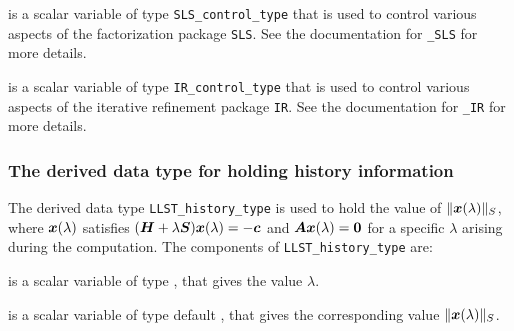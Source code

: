 \documentclass{galahad}
\newcommand{\packagename}{LLST}
\begin{document}
\begin{description}
 is a scalar variable of type
{\tt SLS\_control\_type} that is used to control various aspects of the
factorization package {\tt SLS}. See the documentation for
{\tt \libraryname\_SLS} for more details.

 is a scalar variable of type
{\tt IR\_control\_type} that is used to control various aspects of the
iterative refinement package {\tt IR}. See the documentation for
{\tt \libraryname\_IR} for more details.

\end{description}


\subsubsection{The derived data type for holding history
 information}\label{typehist}
The derived data type
{\tt \packagename\_history\_type}
is used to hold the value of $\|{\bm{x}}(\lambda)\|_S$, where
${\bm{x}}(\lambda)$ satisfies
$({\bm{H}} + \lambda {\bm{S}}){\bm{x}}(\lambda) = - {\bm{c}}$ and ${\bm{A}}{\bm{x}}(\lambda) = {\bm{0}}$
for a specific $\lambda$ arising during the computation.
The components of
{\tt \packagename\_history\_type}
are:
\begin{description}
 is a scalar variable of type \realdp, that gives
 the value $\lambda$.

 is a scalar variable of type default \real, that gives
 the corresponding value $\|{\bm{x}}(\lambda)\|_S$.

\end{description}

\end{document}
